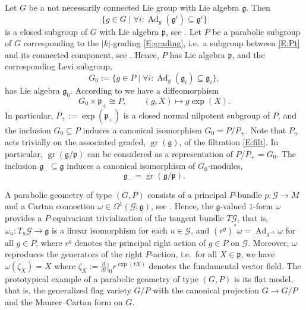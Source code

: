 \documentclass[reqno,12pt]{amsart}
\DeclareMathOperator{\gr}{gr}
\newcommand\goe{\mathfrak g}
\newcommand\poe{\mathfrak p}
\DeclareMathOperator{\Ad}{Ad}
\theoremstyle{plain}
\theoremstyle{definition}
\begin{document}
Let $G$ be a not necessarily connected Lie group with Lie algebra $\goe$.
Then
\begin{equation}\label{E:Pt}
\{g\in G\mid\forall i:\Ad_g(\goe^i)\subseteq\goe^i\}
\end{equation}
is a closed subgroup of $G$ with Lie algebra $\poe$, see \cite[Lemma~3.1.3(2)]{CS09}.
Let $P$ be a parabolic subgroup of $G$ corresponding to the $|k|$-grading \eqref{E:grading}, i.e.\ a subgroup between \eqref{E:Pt}
and its connected component, see \cite[Definition~3.1.3]{CS09}. Hence, $P$ has Lie algebra $\poe$, and
the corresponding Levi subgroup,
$$
G_0:=\{g\in P\mid\forall i:\Ad_g(\goe_i)\subseteq\goe_i\},
$$
has Lie algebra $\goe_0$. According to \cite[Theorem~3.1.3]{CS09} we have a diffeomorphism
\begin{equation}\label{E:PG0iso}
G_0\times\poe_+\cong P,\qquad (g,X)\mapsto g\exp(X).
\end{equation}
In particular, $P_+:=\exp(\poe_+)$ is a closed normal nilpotent subgroup of $P$, and the inclusion $G_0\subseteq P$ induces a canonical isomorphism $G_0=P/P_+$.
Note that $P_+$ acts trivially on the associated graded, $\gr(\goe)$, of the filtration \eqref{E:filt}. 
In particular, $\gr(\goe/\poe)$ can be considered as a representation of $P/P_+=G_0$. 
The inclusion $\goe_-\subseteq\goe$ induces a canonical isomorphism of $G_0$-modules,
\begin{equation}\label{E:grgp}
\goe_-=\gr(\goe/\poe).
\end{equation}


A parabolic geometry of type $(G,P)$ consists of a principal $P$-bundle $p\colon\mathcal G\to M$ and a Cartan connection $\omega\in\Omega^1(\mathcal G;\goe)$, see \cite[Definition~3.1.4 and Section~1.5]{CS09}.
Hence, the $\goe$-valued $1$-form $\omega$ provides a $P$-equivariant trivialization of the tangent bundle $T\mathcal G$, that is, $\omega_u\colon T_u\mathcal G\to\goe$ is a linear isomorphism for each $u\in\mathcal G$, and $(r^g)^*\omega=\Ad_{g^{-1}}\omega$ for all $g\in P$,
where $r^g$ denotes the principal right action of $g\in P$ on $\mathcal G$.
Moreover, $\omega$ reproduces the generators of the right $P$-action, i.e.\ for all $X\in\poe$, we have $\omega(\zeta_X)=X$ where $\zeta_X:=\frac d{dt}|_0r^{\exp(tX)}$ denotes the fundamental vector field.
The prototypical example of a parabolic geometry of type $(G,P)$ is its flat model, that is, the generalized flag variety $G/P$ with the canonical projection $G\to G/P$ and the Maurer--Cartan form on $G$.
\end{document}

